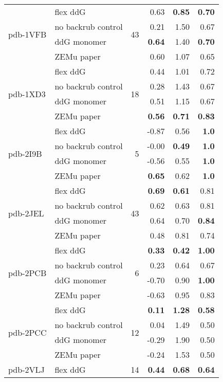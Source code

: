 {\begin{longtable}{llrrrr}
\hline
 \multirow{ 4}{*}{pdb-1VFB} & flex ddG & \multirow{ 4}{*}{43} & 0.63 & \textbf{0.85} & \textbf{0.70}  \\
 & no backrub control & & 0.21 & 1.50 & 0.67  \\
 & ddG monomer & & \textbf{0.64} & 1.40 & \textbf{0.70}  \\
 & ZEMu paper & & 0.60 & 1.07 & 0.65  \\
\hline
 \multirow{ 4}{*}{pdb-1XD3} & flex ddG & \multirow{ 4}{*}{18} & 0.44 & 1.01 & 0.72  \\
 & no backrub control & & 0.28 & 1.43 & 0.67  \\
 & ddG monomer & & 0.51 & 1.15 & 0.67  \\
 & ZEMu paper & & \textbf{0.56} & \textbf{0.71} & \textbf{0.83}  \\
\hline
 \multirow{ 4}{*}{pdb-2I9B} & flex ddG & \multirow{ 4}{*}{5} & -0.87 & 0.56 & \textbf{1.0}  \\
 & no backrub control & & -0.00 & \textbf{0.49} & \textbf{1.0}  \\
 & ddG monomer & & -0.56 & 0.55 & \textbf{1.0}  \\
 & ZEMu paper & & \textbf{0.65} & 0.62 & \textbf{1.0}  \\
\hline
 \multirow{ 4}{*}{pdb-2JEL} & flex ddG & \multirow{ 4}{*}{43} & \textbf{0.69} & \textbf{0.61} & 0.81  \\
 & no backrub control & & 0.62 & 0.63 & 0.81  \\
 & ddG monomer & & 0.64 & 0.70 & \textbf{0.84}  \\
 & ZEMu paper & & 0.48 & 0.81 & 0.74  \\
\hline
 \multirow{ 4}{*}{pdb-2PCB} & flex ddG & \multirow{ 4}{*}{6} & \textbf{0.33} & \textbf{0.42} & \textbf{1.00}  \\
 & no backrub control & & 0.23 & 0.64 & 0.67  \\
 & ddG monomer & & -0.70 & 0.90 & \textbf{1.00}  \\
 & ZEMu paper & & -0.63 & 0.95 & 0.83  \\
\hline
 \multirow{ 4}{*}{pdb-2PCC} & flex ddG & \multirow{ 4}{*}{12} & \textbf{0.11} & \textbf{1.28} & \textbf{0.58}  \\
 & no backrub control & & 0.04 & 1.49 & 0.50  \\
 & ddG monomer & & -0.29 & 1.90 & 0.50  \\
 & ZEMu paper & & -0.24 & 1.53 & 0.50  \\
\hline
 \multirow{ 4}{*}{pdb-2VLJ} & flex ddG & \multirow{ 4}{*}{14} & \textbf{0.44} & \textbf{0.68} & \textbf{0.64}  \\

\end{longtable}}
